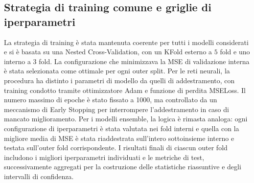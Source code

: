 \documentclass[a4paper,12pt]{report}
\begin{document}
	\subsection{Strategia di training comune e griglie di iperparametri}
	La strategia di training è stata mantenuta coerente per tutti i modelli considerati e si è basata su una Nested Cross-Validation, con un KFold esterno a $5$ fold e uno interno a $3$ fold. La configurazione che minimizzava la MSE di validazione interna è stata selezionata come ottimale per ogni outer split. Per le reti neurali, la procedura ha distinto i parametri di modello da quelli di addestramento, con training condotto tramite ottimizzatore Adam e funzione di perdita MSELoss. Il numero massimo di epoche è stato fissato a 1000, ma controllato da un meccanismo di Early Stopping per interrompere l’addestramento in caso di mancato miglioramento. Per i modelli ensemble, la logica è rimasta analoga: ogni configurazione di iperparametri è stata valutata nei fold interni e quella con la migliore media di MSE è stata riaddestrata sull’intero sottoinsieme interno e testata sull’outer fold corrispondente. I risultati finali di ciascun outer fold includono i migliori iperparametri individuati e le metriche di test, successivamente aggregati per la costruzione delle statistiche riassuntive e degli intervalli di confidenza.
	
\end{document}
